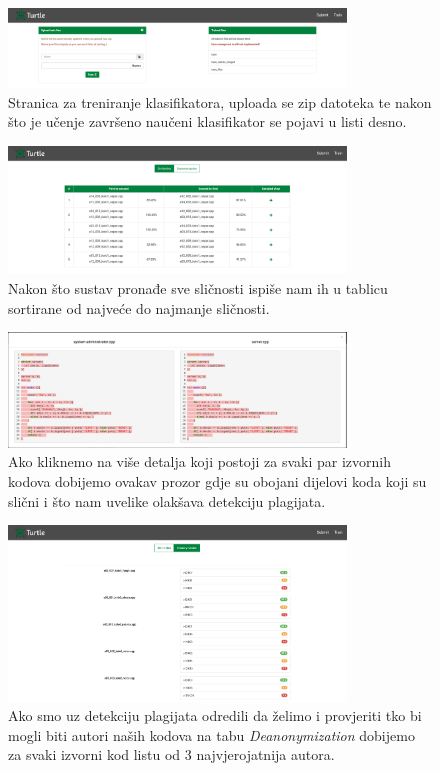 \begin{figure}[htb]
	\centering
	\includegraphics[width=0.8\textwidth,keepaspectratio]{fig/train.png}
	\caption{Stranica za treniranje klasifikatora, uploada se zip datoteka te nakon što je učenje završeno naučeni klasifikator se pojavi u listi desno.}
\end{figure}
\vspace*{4cm}
\begin{figure}[htb]
	\centering
	\includegraphics[width=0.8\textwidth,keepaspectratio]{fig/pairs.png}
	\caption{Nakon što sustav pronađe sve sličnosti ispiše nam ih u tablicu sortirane od najveće do najmanje sličnosti.}
\end{figure}

\newpage
\vspace*{2cm}
\begin{figure}[htb]
	\centering
	\includegraphics[width=0.8\textwidth,keepaspectratio]{fig/colors.png}
	\caption{Ako kliknemo na više detalja koji postoji za svaki par izvornih kodova dobijemo ovakav prozor gdje su obojani dijelovi koda koji su slični i što nam uvelike olakšava detekciju plagijata.}
\end{figure}
\vspace*{4cm}
\begin{figure}[htb]
	\centering
	\includegraphics[width=0.8\textwidth,keepaspectratio]{fig/authors.png}
	\caption{Ako smo uz detekciju plagijata odredili da želimo i provjeriti tko bi mogli biti autori naših kodova na tabu \textit{Deanonymization} dobijemo za svaki izvorni kod listu od 3 najvjerojatnija autora.}
\end{figure}


